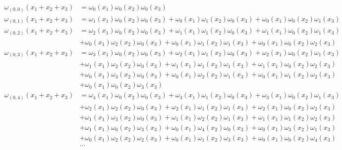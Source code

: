 \begin{equation*} \begin{aligned}
\omega_{(0,0)}(x_1 + x_2 + x_3) &=  
  \omega_0(x_1) \omega_0(x_2) \omega_0(x_3) \\
%
\omega_{(0,1)}(x_1 + x_2 + x_3) &=  
  \omega_1(x_1) \omega_0(x_2) \omega_0(x_3)
+ \omega_0(x_1) \omega_1(x_2) \omega_0(x_3)
+ \omega_0(x_1) \omega_0(x_2) \omega_1(x_3) \\
%
\omega_{(0,2)}(x_1 + x_2 + x_3) &=  
  \omega_2(x_1) \omega_0(x_2) \omega_0(x_3)
+ \omega_1(x_1) \omega_1(x_2) \omega_0(x_3)
+ \omega_1(x_1) \omega_0(x_2) \omega_1(x_3) \\ &
+ \omega_0(x_1) \omega_2(x_2) \omega_0(x_3)
+ \omega_0(x_1) \omega_1(x_2) \omega_1(x_3)
+ \omega_0(x_1) \omega_0(x_2) \omega_2(x_3) \\
%
\omega_{(0,3)}(x_1 + x_2 + x_3) &=  
  \omega_3(x_1) \omega_0(x_2) \omega_0(x_3)
+ \omega_2(x_1) \omega_1(x_2) \omega_0(x_3)
+ \omega_2(x_1) \omega_0(x_2) \omega_1(x_3) \\ &
+ \omega_1(x_1) \omega_2(x_2) \omega_0(x_3)
+ \omega_1(x_1) \omega_1(x_2) \omega_1(x_3)
+ \omega_1(x_1) \omega_0(x_2) \omega_2(x_3) \\ &
+ \omega_0(x_1) \omega_3(x_2) \omega_0(x_3)
+ \omega_0(x_1) \omega_2(x_2) \omega_1(x_3)
+ \omega_0(x_1) \omega_1(x_2) \omega_2(x_3) \\ &
+ \omega_0(x_1) \omega_0(x_2) \omega_3(x_3) \\
%
\omega_{(0,4)}(x_1 + x_2 + x_3) &=  
  \omega_4(x_1) \omega_0(x_2) \omega_0(x_3)
+ \omega_3(x_1) \omega_1(x_2) \omega_0(x_3)
+ \omega_3(x_1) \omega_0(x_2) \omega_1(x_3) \\ &
+ \omega_2(x_1) \omega_2(x_2) \omega_0(x_3)
+ \omega_2(x_1) \omega_1(x_2) \omega_1(x_3)
+ \omega_2(x_1) \omega_0(x_2) \omega_2(x_3) \\ &
+ \omega_1(x_1) \omega_3(x_2) \omega_0(x_3)
+ \omega_1(x_1) \omega_2(x_2) \omega_1(x_3)
+ \omega_1(x_1) \omega_1(x_2) \omega_2(x_3) \\ &
+ \omega_1(x_1) \omega_0(x_2) \omega_3(x_3)
+ \omega_0(x_1) \omega_4(x_2) \omega_0(x_3)
+ \omega_0(x_1) \omega_3(x_2) \omega_1(x_3) \\ &
+ \omega_0(x_1) \omega_2(x_2) \omega_2(x_3)
+ \omega_0(x_1) \omega_1(x_2) \omega_3(x_3)
+ \omega_0(x_1) \omega_0(x_2) \omega_4(x_3) \\
%
&\ldots \\
\end{aligned} \end{equation*}

